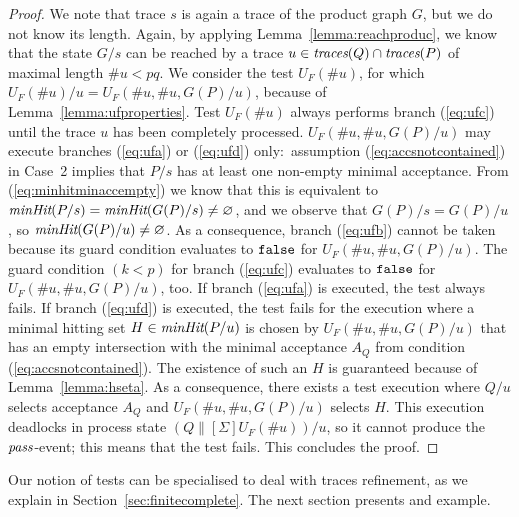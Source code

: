 \begin{proof}
\medskip
{} We note 
that trace $s$ is again a trace of the
product graph $G$, but we do not know its length. Again, by applying
Lemma~\ref{lemma:reachproduc}, we know that the state $G/s$ can be reached by
a trace $u\in\text{\it traces}(Q)\cap\text{\it traces}(P)$ of maximal length $\#u < pq$. We consider
the test $U_F(\# u)$, for which $U_F(\# u)/u = U_F(\#u,\#u,G(P)/u)$, because
of Lemma~\ref{lemma:ufproperties}. Test $U_F(\#u)$   always performs branch
(\ref{eq:ufc}) until the trace $u$ has been completely processed.
$U_F(\#u,\#u,G(P)/u)$ may execute branches (\ref{eq:ufa}) or (\ref{eq:ufd})
only:~assumption (\ref{eq:accsnotcontained}) in Case~2 implies that $P/s$ has
at least one non-empty minimal acceptance. From (\ref{eq:minhitminaccempty})
we know that this is equivalent to $\text{\it minHit}(P/s) =
\text{\it minHit}(G(P)/s)\neq\varnothing$, and we observe that $G(P)/s = G(P)/u$, so
$\text{\it minHit}(G(P)/u)\neq\varnothing$. As a consequence, branch (\ref{eq:ufb})
cannot be taken because its guard condition evaluates to $\mbox{{\tt false}}$  for
$U_F(\#u,\#u,G(P)/u)$. The guard condition $(k < p)$ for branch
(\ref{eq:ufc}) evaluates to $\mbox{{\tt false}}$ for $U_F(\#u,\#u,G(P)/u)$, too. If branch
(\ref{eq:ufa}) is executed, the test always fails. If branch (\ref{eq:ufd})
is executed, the test fails for the execution where a minimal hitting set
$H\in\text{\it minHit}(P/u)$ is chosen by $U_F(\#u,\#u,G(P)/u)$ that has an empty
intersection with the minimal acceptance $A_Q$ from condition
(\ref{eq:accsnotcontained}). The existence of such an $H$ is guaranteed
because of Lemma~\ref{lemma:hseta}. As a consequence, there exists a test
execution   where $Q/u$ selects acceptance $A_Q$ and $U_F(\#u,\#u,G(P)/u)$
selects $H$. This execution deadlocks in process state
$(Q\parallel[\Sigma]U_F(\# u))/u$, so it cannot produce the ${\text{\it pass}}$-event;
this means that the test fails. This
concludes the proof. 
\xbox
\end{proof}
%
Our notion of tests can be specialised to deal with traces refinement, as we
explain in Section~\ref{sec:finitecomplete}. 
The next section presents and example.

